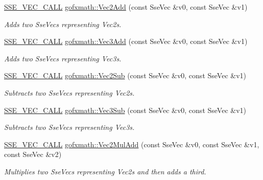 \begin{DoxyCompactItemize}
\hyperlink{ssevec__math__defs_8h_a97454f977a5281455cecacce1e8ba670}{S\+S\+E\+\_\+\+V\+E\+C\+\_\+\+C\+A\+L\+L} \hyperlink{group___s_i_m_d_vec_math_gad1bc5d9e13ba5c54e2bf457ef9c0a30b}{gofxmath\+::\+Vec2\+Add} (const Sse\+Vec \&v0, const Sse\+Vec \&v1)
\begin{DoxyCompactList}\small\item\em Adds two Sse\+Vecs representing Vec2s. \end{DoxyCompactList}\item 
\hyperlink{ssevec__math__defs_8h_a97454f977a5281455cecacce1e8ba670}{S\+S\+E\+\_\+\+V\+E\+C\+\_\+\+C\+A\+L\+L} \hyperlink{group___s_i_m_d_vec_math_ga8a939dc9ef27240f00b4e0062afa4f92}{gofxmath\+::\+Vec3\+Add} (const Sse\+Vec \&v0, const Sse\+Vec \&v1)
\begin{DoxyCompactList}\small\item\em Adds two Sse\+Vecs representing Vec3s. \end{DoxyCompactList}\item 
\hyperlink{ssevec__math__defs_8h_a97454f977a5281455cecacce1e8ba670}{S\+S\+E\+\_\+\+V\+E\+C\+\_\+\+C\+A\+L\+L} \hyperlink{group___s_i_m_d_vec_math_ga0be0d77c16ddfb98fe517eb0dfa36545}{gofxmath\+::\+Vec2\+Sub} (const Sse\+Vec \&v0, const Sse\+Vec \&v1)
\begin{DoxyCompactList}\small\item\em Subtracts two Sse\+Vecs representing Vec2s. \end{DoxyCompactList}\item 
\hyperlink{ssevec__math__defs_8h_a97454f977a5281455cecacce1e8ba670}{S\+S\+E\+\_\+\+V\+E\+C\+\_\+\+C\+A\+L\+L} \hyperlink{group___s_i_m_d_vec_math_gad3a936a686c5d67ed357c9f5b8fc3935}{gofxmath\+::\+Vec3\+Sub} (const Sse\+Vec \&v0, const Sse\+Vec \&v1)
\begin{DoxyCompactList}\small\item\em Subtracts two Sse\+Vecs representing Vec3s. \end{DoxyCompactList}\item 
\hyperlink{ssevec__math__defs_8h_a97454f977a5281455cecacce1e8ba670}{S\+S\+E\+\_\+\+V\+E\+C\+\_\+\+C\+A\+L\+L} \hyperlink{group___s_i_m_d_vec_math_gac636b80fed0de6de23d967e2c3843c5c}{gofxmath\+::\+Vec2\+Mul\+Add} (const Sse\+Vec \&v0, const Sse\+Vec \&v1, const Sse\+Vec \&v2)
\begin{DoxyCompactList}\small\item\em Multiplies two Sse\+Vecs representing Vec2s and then adds a third. \end{DoxyCompactList}\item 

\end{DoxyCompactItemize}
